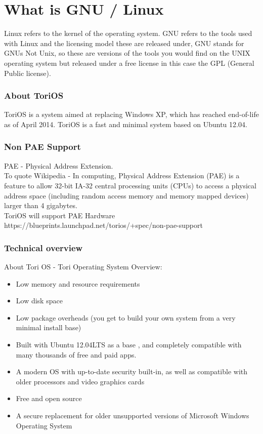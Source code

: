 \documentclass[12pt,a4paper]{book}
\begin{document}
\chapter{What is GNU / Linux}

Linux refers to the kernel of the operating system.  GNU refers to the tools used with Linux and the licensing model these are released under,  GNU stands for GNUs Not Unix,  so these are versions of the tools you would find on the UNIX operating system but released under a free license in this case the GPL (General Public license).
\subsection{About ToriOS}
ToriOS is a system aimed at replacing Windows XP, which has reached end-of-life as of April 2014. ToriOS is a fast and minimal system based on Ubuntu 12.04. 

\subsection{Non PAE Support}

PAE - Physical Address Extension.\\
To quote Wikipedia - In computing, Physical Address Extension (PAE) is a feature to allow 32-bit IA-32 central processing units (CPUs) to access a physical address space (including random access memory and memory mapped devices) larger than 4 gigabytes.  \\




ToriOS will support PAE Hardware\\
https://blueprints.launchpad.net/torios/+spec/non-pae-support

\newpage 
\subsection{Technical overview}
About Tori OS - Tori Operating System Overview:

\begin{itemize}
\item{Low memory and resource requirements}
\item{Low disk space}
\item{Low package overheads (you get to build your own system from a very minimal install base)}
\item{Built with Ubuntu 12.04LTS as a base , and completely compatible with many thousands of free and paid apps.}
\item{ A modern OS with up-to-date security built-in, as well as compatible with older processors and video graphics cards}
\item{Free and open source}
\item{A secure replacement for older unsupported versions of Microsoft Windows Operating System} 
\end{itemize}
\end{document}
